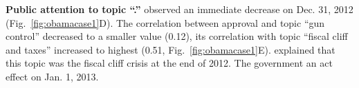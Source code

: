 \noindent \textbf{\normalsize Public attention  to topic ``.''}
 observed an immediate decrease   on Dec. 31, 2012 (Fig.~\ref{fig:obamacase1}D).
The correlation between  approval and  topic ``gun control'' decreased to a smaller value (0.12),  its correlation with topic ``fiscal cliff and taxes'' increased to  highest (0.51, Fig.~\ref{fig:obamacase1}E).
 explained that this topic was  the fiscal cliff crisis at the end of 2012.
The government  an act  effect on Jan. 1, 2013.
